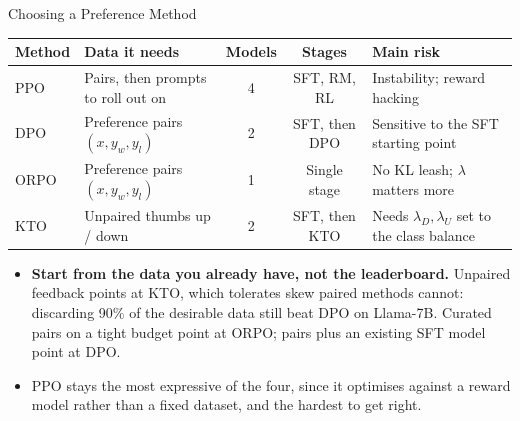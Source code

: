 \begin{frame}[t]{Choosing a Preference Method}
  \begin{center}
    \scriptsize
    \renewcommand{\arraystretch}{1.3}
    \begin{tabular}{|l|>{\raggedright\arraybackslash}p{3.0cm}|c|c|>{\raggedright\arraybackslash}p{3.3cm}|}
      \hline
      \textbf{Method} & \textbf{Data it needs} & \textbf{Models} & \textbf{Stages} & \textbf{Main risk} \\
      \hline
      PPO & Pairs, then prompts to roll out on & 4 & SFT, RM, RL & Instability; reward hacking \\
      DPO & Preference pairs $(x, y_w, y_l)$ & 2 & SFT, then DPO & Sensitive to the SFT starting point \\
      ORPO & Preference pairs $(x, y_w, y_l)$ & 1 & Single stage & No KL leash; $\lambda$ matters more \\
      KTO & Unpaired thumbs up / down & 2 & SFT, then KTO & Needs $\lambda_D, \lambda_U$ set to the class balance \\
      \hline
    \end{tabular}
  \end{center}
  \vspace{0.4em}
  \begin{itemize}
    \item[\textcolor{red}{$\blacktriangleright$}] \textbf{Start from the data you already have, not the leaderboard.} Unpaired feedback points at KTO, which tolerates skew paired methods cannot: discarding 90\% of the desirable data still beat DPO on Llama-7B. Curated pairs on a tight budget point at ORPO; pairs plus an existing SFT model point at DPO.
    \item[\textcolor{red}{$\blacktriangleright$}] PPO stays the most expressive of the four, since it optimises against a reward model rather than a fixed dataset, and the hardest to get right.
  \end{itemize}
\end{frame}
